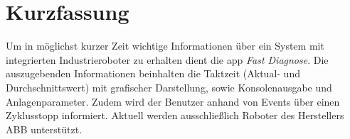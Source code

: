 \chapter*{Kurzfassung}
\thispagestyle{empty}
Um in möglichst kurzer Zeit wichtige Informationen über ein System mit 
integrierten Industrieroboter zu erhalten dient die \gls{app} \textit{Fast 
Diagnose}. Die auszugebenden Informationen beinhalten die Taktzeit (Aktual- und 
Durchschnittswert) mit grafischer Darstellung, sowie Konsolenausgabe und 
Anlagenparameter. Zudem wird der Benutzer anhand von Events über einen 
Zyklusstopp informiert. Aktuell werden ausschließlich Roboter des Herstellers 
ABB unterstützt.